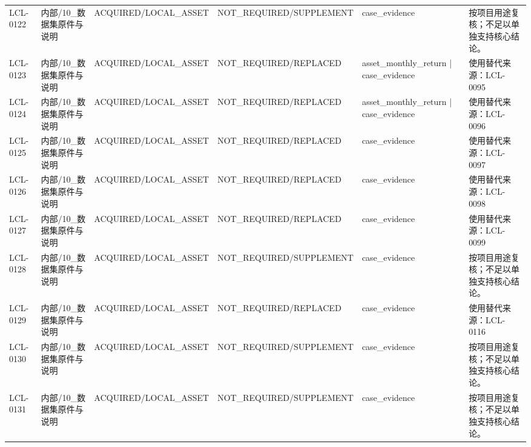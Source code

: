 \begin{landscape}
\begin{longtable}{p{1.8cm}p{2.6cm}p{2.6cm}p{2.6cm}p{4.8cm}p{7.2cm}}
LCL-0122 & 内部/\allowbreak{}10\_\allowbreak{}数据集原件与说明 & ACQUIRED/\allowbreak{}LOCAL\_\allowbreak{}ASSET & NOT\_\allowbreak{}REQUIRED/\allowbreak{}SUPPLEMENT & case\_\allowbreak{}evidence & 按项目用途复核；不足以单独支持核心结论。\\
LCL-0123 & 内部/\allowbreak{}10\_\allowbreak{}数据集原件与说明 & ACQUIRED/\allowbreak{}LOCAL\_\allowbreak{}ASSET & NOT\_\allowbreak{}REQUIRED/\allowbreak{}REPLACED & asset\_\allowbreak{}monthly\_\allowbreak{}return | case\_\allowbreak{}evidence & 使用替代来源：LCL-0095\\
LCL-0124 & 内部/\allowbreak{}10\_\allowbreak{}数据集原件与说明 & ACQUIRED/\allowbreak{}LOCAL\_\allowbreak{}ASSET & NOT\_\allowbreak{}REQUIRED/\allowbreak{}REPLACED & asset\_\allowbreak{}monthly\_\allowbreak{}return | case\_\allowbreak{}evidence & 使用替代来源：LCL-0096\\
LCL-0125 & 内部/\allowbreak{}10\_\allowbreak{}数据集原件与说明 & ACQUIRED/\allowbreak{}LOCAL\_\allowbreak{}ASSET & NOT\_\allowbreak{}REQUIRED/\allowbreak{}REPLACED & case\_\allowbreak{}evidence & 使用替代来源：LCL-0097\\
LCL-0126 & 内部/\allowbreak{}10\_\allowbreak{}数据集原件与说明 & ACQUIRED/\allowbreak{}LOCAL\_\allowbreak{}ASSET & NOT\_\allowbreak{}REQUIRED/\allowbreak{}REPLACED & case\_\allowbreak{}evidence & 使用替代来源：LCL-0098\\
LCL-0127 & 内部/\allowbreak{}10\_\allowbreak{}数据集原件与说明 & ACQUIRED/\allowbreak{}LOCAL\_\allowbreak{}ASSET & NOT\_\allowbreak{}REQUIRED/\allowbreak{}REPLACED & case\_\allowbreak{}evidence & 使用替代来源：LCL-0099\\
LCL-0128 & 内部/\allowbreak{}10\_\allowbreak{}数据集原件与说明 & ACQUIRED/\allowbreak{}LOCAL\_\allowbreak{}ASSET & NOT\_\allowbreak{}REQUIRED/\allowbreak{}SUPPLEMENT & case\_\allowbreak{}evidence & 按项目用途复核；不足以单独支持核心结论。\\
LCL-0129 & 内部/\allowbreak{}10\_\allowbreak{}数据集原件与说明 & ACQUIRED/\allowbreak{}LOCAL\_\allowbreak{}ASSET & NOT\_\allowbreak{}REQUIRED/\allowbreak{}REPLACED & case\_\allowbreak{}evidence & 使用替代来源：LCL-0116\\
LCL-0130 & 内部/\allowbreak{}10\_\allowbreak{}数据集原件与说明 & ACQUIRED/\allowbreak{}LOCAL\_\allowbreak{}ASSET & NOT\_\allowbreak{}REQUIRED/\allowbreak{}SUPPLEMENT & case\_\allowbreak{}evidence & 按项目用途复核；不足以单独支持核心结论。\\
LCL-0131 & 内部/\allowbreak{}10\_\allowbreak{}数据集原件与说明 & ACQUIRED/\allowbreak{}LOCAL\_\allowbreak{}ASSET & NOT\_\allowbreak{}REQUIRED/\allowbreak{}SUPPLEMENT & case\_\allowbreak{}evidence & 按项目用途复核；不足以单独支持核心结论。\\

\end{longtable}
\end{landscape}
